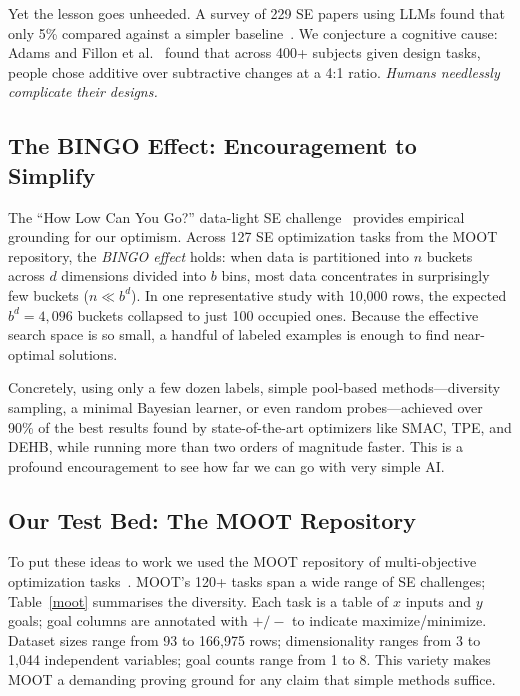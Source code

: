 \documentclass[AMA,STIX2COL]{WileyNJDv5}
\begin{document}
Yet the lesson goes unheeded. A survey of 229 SE papers
using LLMs found that only 5\% compared against a simpler
baseline~\cite{Hou24}. We conjecture a cognitive cause:
Adams and Fillon et al.~\cite{adams2021people,Fillon25}
found that across 400+ subjects given design tasks, people
chose additive over subtractive changes at a 4:1 ratio.
{\em Humans needlessly complicate their designs.}

\subsection{The BINGO Effect: Encouragement to Simplify}

The ``How Low Can You Go?'' data-light SE
challenge~\cite{ganguly2025lowgodatalightse} provides
empirical grounding for our optimism. Across 127 SE
optimization tasks from the MOOT repository, the
\emph{BINGO effect} holds: when data is partitioned into
$n$ buckets across $d$ dimensions divided into $b$ bins,
most data concentrates in surprisingly few buckets
($n \ll b^d$). In one representative study with 10,000
rows, the expected $b^d = 4{,}096$ buckets collapsed to
just 100 occupied ones. Because the effective search space
is so small, a handful of labeled examples is enough to
find near-optimal solutions.

Concretely, using only a few dozen labels, simple
pool-based methods---diversity sampling, a minimal Bayesian
learner, or even random probes---achieved over 90\% of the
best results found by state-of-the-art optimizers like
SMAC, TPE, and DEHB, while running more than two orders
of magnitude faster. This is a profound encouragement to
see how far we can go with very simple AI.

\subsection{Our Test Bed: The MOOT Repository}

To put these ideas to work we used the MOOT repository of
multi-objective optimization
tasks~\cite{menzies2026moot}. MOOT's 120+ tasks span a
wide range of SE challenges; Table~\ref{moot} summarises
the diversity. Each task is a table of $x$ inputs and $y$
goals; goal columns are annotated with $+/-$ to indicate
maximize/minimize. Dataset sizes range from 93 to
166,975 rows; dimensionality ranges from 3 to 1,044
independent variables; goal counts range from 1 to 8.
This variety makes MOOT a demanding proving ground for
any claim that simple methods suffice.
\end{document}
